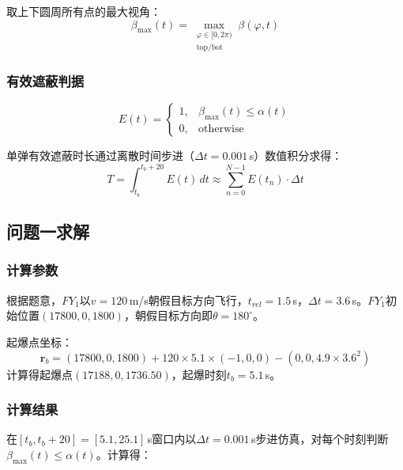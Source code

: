\documentclass[12pt,a4paper]{article}
\begin{document}
取上下圆周所有点的最大视角：
\begin{equation}
\beta_{\max}(t) = \max_{\substack{\varphi \in [0, 2\pi) \\ \text{top/bot}}} \beta(\varphi, t)
\end{equation}

\subsubsection{有效遮蔽判据}

\begin{equation}
\boxed{E(t) = \begin{cases} 1, & \beta_{\max}(t) \leq \alpha(t) \\ 0, & \text{otherwise} \end{cases}}
\end{equation}

单弹有效遮蔽时长通过离散时间步进（$\Delta t = 0.001$\,s）数值积分求得：
\begin{equation}
T = \int_{t_b}^{t_b + 20} E(t) \, dt \approx \sum_{n=0}^{N-1} E(t_n) \cdot \Delta t
\end{equation}

\subsection{问题一求解}

\subsubsection{计算参数}

根据题意，$FY_1$以$v=120$\,m/s朝假目标方向飞行，$t_{rel}=1.5$\,s，$\Delta t=3.6$\,s。$FY_1$初始位置$(17800, 0, 1800)$，朝假目标方向即$\theta = 180^\circ$。

起爆点坐标：
\begin{equation}
\mathbf{r}_b = (17800, 0, 1800) + 120 \times 5.1 \times (-1, 0, 0) - (0, 0, 4.9 \times 3.6^2)
\end{equation}
计算得起爆点$(17188, 0, 1736.50)$，起爆时刻$t_b = 5.1$\,s。

\subsubsection{计算结果}

在$[t_b, t_b + 20] = [5.1, 25.1]$\,s窗口内以$\Delta t = 0.001$\,s步进仿真，对每个时刻判断$\beta_{\max}(t) \leq \alpha(t)$。计算得：
\end{document}
